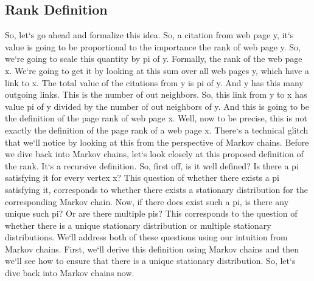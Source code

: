 \subsection{Rank Definition}
So, let`s go ahead and formalize this idea.
So, a citation from web page y, it`s value is going to be proportional to the importance the rank of web page y.
So, we`re going to scale this quantity by pi of y.
Formally, the rank of the web page x.
We`re going to get it by looking at this sum over all web pages y, which have a link to x.
The total value of the citations from y is pi of y.
And y has this many outgoing links.
This is the number of out neighbors.
So, this link from y to x has value pi of y divided by the number of out neighbors of y.
And this is going to be the definition of the page rank of web page x.
Well, now to be precise, this is not exactly the definition of the page rank of a web page x.
There`s a technical glitch that we`ll notice by looking at this from the perspective of Markov chains.
Before we dive back into Markov chains, let`s look closely at this proposed definition of the rank.
It`s a recursive definition.
So, first off, is it well defined? Is there a pi satisfying it for every vertex x? This question of whether there exists a pi satisfying it, corresponds to whether there exists a stationary distribution for the corresponding Markov chain.
Now, if there does exist such a pi, is there any unique such pi? Or are there multiple pis? This corresponds to the question of whether there is a unique stationary distribution or multiple stationary distributions.
We`ll address both of these questions using our intuition from Markov chains.
First, we`ll derive this definition using Markov chains and then we`ll see how to ensure that there is a unique stationary distribution.
So, let`s dive back into Markov chains now.


